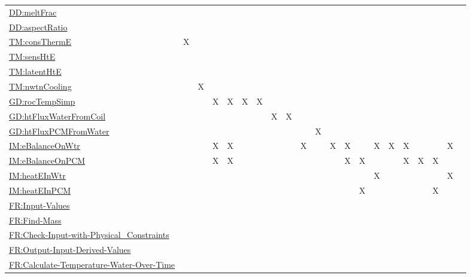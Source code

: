\documentclass[12pt]{article}
\begin{document}
\begin{longtable}{l l l l l l l l l l l l l l l l l l l l l}
\\
\hyperref[DD:meltFrac]{DD:meltFrac} &  &  &  &  &  &  &  &  &  &  &  &  &  &  &  &  &  &  &  & 
\\
\hyperref[DD:aspectRatio]{DD:aspectRatio} &  &  &  &  &  &  &  &  &  &  &  &  &  &  &  &  &  &  &  & 
\\
\hyperref[TM:consThermE]{TM:consThermE} & X &  &  &  &  &  &  &  &  &  &  &  &  &  &  &  &  &  &  & 
\\
\hyperref[TM:sensHtE]{TM:sensHtE} &  &  &  &  &  &  &  &  &  &  &  &  &  &  &  &  &  &  &  & 
\\
\hyperref[TM:latentHtE]{TM:latentHtE} &  &  &  &  &  &  &  &  &  &  &  &  &  &  &  &  &  &  &  & 
\\
\hyperref[TM:nwtnCooling]{TM:nwtnCooling} &  & X &  &  &  &  &  &  &  &  &  &  &  &  &  &  &  &  &  & 
\\
\hyperref[GD:rocTempSimp]{GD:rocTempSimp} &  &  & X & X & X & X &  &  &  &  &  &  &  &  &  &  &  &  &  & 
\\
\hyperref[GD:htFluxWaterFromCoil]{GD:htFluxWaterFromCoil} &  &  &  &  &  &  & X & X &  &  &  &  &  &  &  &  &  &  &  & 
\\
\hyperref[GD:htFluxPCMFromWater]{GD:htFluxPCMFromWater} &  &  &  &  &  &  &  &  &  & X &  &  &  &  &  &  &  &  &  & 
\\
\hyperref[IM:eBalanceOnWtr]{IM:eBalanceOnWtr} &  &  & X & X &  &  &  &  & X &  & X & X &  & X & X & X &  &  & X & 
\\
\hyperref[IM:eBalanceOnPCM]{IM:eBalanceOnPCM} &  &  & X & X &  &  &  &  &  &  &  & X & X &  &  & X & X & X &  & 
\\
\hyperref[IM:heatEInWtr]{IM:heatEInWtr} &  &  &  &  &  &  &  &  &  &  &  &  &  & X &  &  &  &  & X & 
\\
\hyperref[IM:heatEInPCM]{IM:heatEInPCM} &  &  &  &  &  &  &  &  &  &  &  &  & X &  &  &  &  & X &  & 
\\
\hyperref[inputValues]{FR:Input-Values} &  &  &  &  &  &  &  &  &  &  &  &  &  &  &  &  &  &  &  & 
\\
\hyperref[findMass]{FR:Find-Mass} &  &  &  &  &  &  &  &  &  &  &  &  &  &  &  &  &  &  &  & 
\\
\hyperref[checkWithPhysConsts]{FR:Check-Input-with-Physical\_Constraints} &  &  &  &  &  &  &  &  &  &  &  &  &  &  &  &  &  &  &  & 
\\
\hyperref[outputInputDerivVals]{FR:Output-Input-Derived-Values} &  &  &  &  &  &  &  &  &  &  &  &  &  &  &  &  &  &  &  & 
\\
\hyperref[calcTempWtrOverTime]{FR:Calculate-Temperature-Water-Over-Time} &  &  &  &  &  &  &  &  &  &  &  &  &  &  &  &  &  &  &  & 

\end{longtable}
\end{document}
